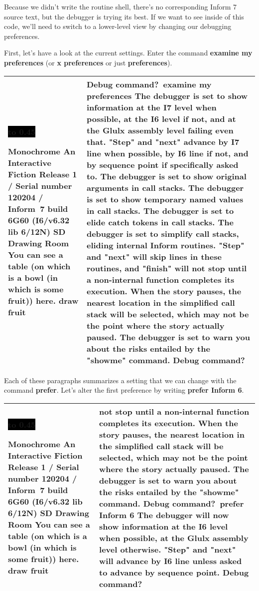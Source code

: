 \documentclass{book}
\newcommand{\n}{\hspace*{\fill}\newline}
\newcommand{\terp}[2]{\begin{center}\begin{tabular}{p{0.45\textwidth}|p{0.45\textwidth}}\midrule #1&#2\\\midrule\end{tabular}\end{center}}
\newcommand{\glkheading}[1]{\textbf{#1}}
\newcommand{\glkinput}[1]{\textbf{#1}}
\newcommand{\glkstatusline}[2]{\centerline{\colorbox{black}{\hbox to 0.45\textwidth{\textcolor{white}{#1\hfil #2}}}}}
\newcommand{\storyprompt}{\raisebox{1.5pt}{\(>\)}}
\newcommand{\cursor}{\raisebox{-1.5pt}{\RectangleThin}}
\begin{document}
Because we didn't write the routine shell, there's no corresponding Inform 7
source text, but the debugger is trying its best.  If we want to see inside of
this code, we'll need to switch to a lower-level view by changing our debugging
preferences.

First, let's have a look at the current settings.  Enter the command
\glkinput{examine my preferences} (or \glkinput{x preferences} or just
\glkinput{preferences}).

\terp{\glkstatusline{Drawing Room}{0/1}\n
  \glkheading{Monochrome}\n
  An Interactive Fiction\n
  Release 1 / Serial number 120204 / Inform~7 build 6G60 (I6/v6.32 lib 6/12N) SD\n
  \n
  \glkheading{Drawing Room}\n
  You can see a table (on which is a bowl (in which is some fruit)) here.\n
  \n
  \storyprompt\glkinput{draw fruit}}{%
  Debug command?\ \glkinput{examine my preferences}\n
  \n
  The debugger is set to show information at the I7 level when possible, at the I6 level if not, and at the Glulx assembly level failing even that.  "Step" and "next" advance by I7 line when possible, by I6 line if not, and by sequence point if specifically asked to.\n
  The debugger is set to show original arguments in call stacks.\n
  The debugger is set to show temporary named values in call stacks.\n
  The debugger is set to elide catch tokens in call stacks.\n
  The debugger is set to simplify call stacks, eliding internal Inform routines.  "Step" and "next" will skip lines in these routines, and "finish" will not stop until a non-internal function completes its execution.  When the story pauses, the nearest location in the simplified call stack will be selected, which may not be the point where the story actually paused.\n
  The debugger is set to warn you about the risks entailed by the "showme" command.\n
  \n
  Debug command?\ \cursor}

Each of these paragraphs summarizes a setting that we can change with the
command \glkinput{prefer}.  Let's alter the first preference by writing
\glkinput{prefer Inform 6}.

\terp{\glkstatusline{Drawing Room}{0/1}\n
  \glkheading{Monochrome}\n
  An Interactive Fiction\n
  Release 1 / Serial number 120204 / Inform~7 build 6G60 (I6/v6.32 lib 6/12N) SD\n
  \n
  \glkheading{Drawing Room}\n
  You can see a table (on which is a bowl (in which is some fruit)) here.\n
  \n
  \storyprompt\glkinput{draw fruit}}{%
  not stop until a non-internal function completes its execution.  When the story pauses, the nearest location in the simplified call stack will be selected, which may not be the point where the story actually paused.\n
  The debugger is set to warn you about the risks entailed by the "showme" command.\n
  \n
  Debug command?\ \glkinput{prefer Inform 6}\n
  \n
  The debugger will now show information at the I6 level when possible, at the Glulx assembly level otherwise.  "Step" and "next" will advance by I6 line unless asked to advance by sequence point.\n
  \n
  Debug command?\ \cursor}
\end{document}
